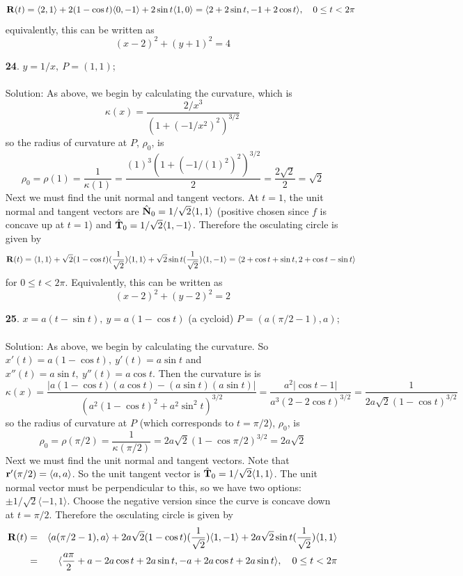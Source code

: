 \documentclass[12pt]{amsbook}
\newcommand{\la}{\langle}
\newcommand{\ra}{\rangle}
\begin{document}
\begin{enumerate}
  $${\bf R}(t)=\la 2,1 \ra + 2(1-\cos t)\la 0, -1 \ra + 2\sin t \la 1,0 \ra = \la 2+2\sin t, -1+2\cos t \ra, \ \ \ 0\leq t <2\pi$$
  equivalently, this can be written as
  $$(x-2)^2+(y+1)^2=4$$
  \item[{\small\bf 24}.] $y=1/x, \ P=(1,1)$;
  \\
  \\
  {\sc Solution}: As above, we begin by calculating the curvature, which is
  $$\kappa(x)=\frac{2/x^3}{(1+(-1/x^2)^2)^{3/2}}$$
  so the radius of curvature at $P$, $\rho_0$, is
  $$\rho_0=\rho(1)=\frac{1}{\kappa(1)}=\frac{(1)^3(1+(-1/(1)^2)^2)^{3/2}}{2}=\frac{2\sqrt{2}}{2}=\sqrt{2}$$
  Next we must find the unit normal and tangent vectors. At $t=1$, the unit normal and tangent vectors are $\hat{\bf N}_0=1/\sqrt{2}\la 1,1 \ra$ (positive chosen since $f$ is concave up at $t=1$) and $\hat{\bf T}_0=1/\sqrt{2}\la 1,-1 \ra$. Therefore the osculating circle is given by
  $${\bf R}(t)=\la 1,1 \ra + \sqrt{2}(1-\cos t)(\frac{1}{\sqrt{2}})\la 1, 1 \ra + \sqrt{2}\sin t(\frac{1}{\sqrt{2}}) \la 1,-1 \ra = \la 2+\cos t +\sin t, 2+\cos t -\sin t \ra$$
  for $0\leq t <2\pi $. Equivalently, this can be written as
  $$(x-2)^2+(y-2)^2=2$$
  \item[{\small\bf 25}.] $x=a(t-\sin t),\ y=a(1-\cos t)$ (a cycloid) $P=(a(\pi/2-1),a)$;
  \\
  \\
  {\sc Solution}: As above, we begin by calculating the curvature. So $x'(t)=a(1-\cos t), \ y'(t)=a \sin t$ and $x''(t)=a \sin t, \ y''(t)=a \cos t$. Then the curvature is is
  $$\kappa(x)=\frac{|a(1-\cos t)(a \cos t)-(a \sin t)(a \sin t)|}{(a^2(1-\cos t)^2+a^2\sin^2 t)^{3/2}}=\frac{a^2|\cos t-1|}{a^3(2-2\cos t)^{3/2}}=\frac{1}{2a\sqrt{2}(1-\cos t)^{3/2}}$$
  so the radius of curvature at $P$ (which corresponds to $t=\pi/2$), $\rho_0$, is
  $$\rho_0=\rho(\pi/2)=\frac{1}{\kappa(\pi/2)}=2a\sqrt{2}(1-\cos \pi/2)^{3/2}=2a\sqrt{2}$$
  Next we must find the unit normal and tangent vectors. Note that ${\bf r}'(\pi/2)=\la a,a \ra$. So the unit tangent vector is $\hat{\bf T}_0=1/\sqrt{2}\la 1,1 \ra$. The unit normal vector must be perpendicular to this, so we have two options: $\pm 1/\sqrt{2}\la -1,1 \ra$. Choose the negative version since the curve is concave down at $t=\pi/2$. Therefore the osculating circle is given by
\begin{eqnarray*}
{\bf R}(t)&=&\la a(\pi/2-1),a \ra + 2a\sqrt{2}(1-\cos t)(\frac{1}{\sqrt{2}})\la 1, -1 \ra + 2a\sqrt{2}\sin t(\frac{1}{\sqrt{2}}) \la 1,1 \ra \\
&=& \la \frac{a\pi}{2}+a-2a\cos t + 2a\sin t, -a+2a\cos t +2a\sin t \ra, \ \ \ 0\leq t <2\pi

\end{eqnarray*}
\end{enumerate}
\end{document}
